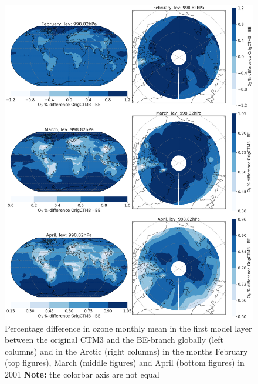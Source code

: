 \begin{figure}[h]
    \centering
    \includegraphics[width = \linewidth]{Chapter6_Results/images/Orig_BE_comp/BE_origPD_percent_lev0_FebApr_2001.png}
    \caption{Percentage difference in ozone monthly mean in the first model layer between the original CTM3 and the BE-branch globally (left columns) and in the Arctic (right columns) in the months February (top figures), March (middle figures) and April (bottom figures) in 2001 \textbf{Note:} the colorbar axis are not equal}
    \label{fig:BE_origPD_percent_FebApr}
\end{figure}


